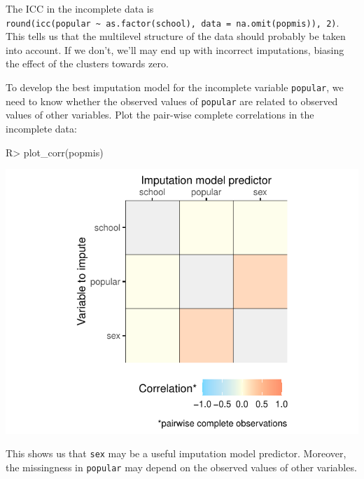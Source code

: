 \documentclass[
]{jss}
\begin{document}
The ICC in the incomplete data is
\texttt{round(icc(popular\ \textasciitilde{}\ as.factor(school),\ data\ =\ na.omit(popmis)),\ 2)}.
This tells us that the multilevel structure of the data should probably
be taken into account. If we don't, we'll may end up with incorrect
imputations, biasing the effect of the clusters towards zero.

To develop the best imputation model for the incomplete variable
\texttt{popular}, we need to know whether the observed values of
\texttt{popular} are related to observed values of other variables. Plot
the pair-wise complete correlations in the incomplete data:

\begin{CodeChunk}
\begin{CodeInput}
R> plot_corr(popmis)
\end{CodeInput}


\begin{center}\includegraphics{Imputation_of_Incomplete_Multilevel_Data_files/figure-latex/pop-corr-1} \end{center}

\end{CodeChunk}

This shows us that \texttt{sex} may be a useful imputation model
predictor. Moreover, the missingness in \texttt{popular} may depend on
the observed values of other variables.
\end{document}
